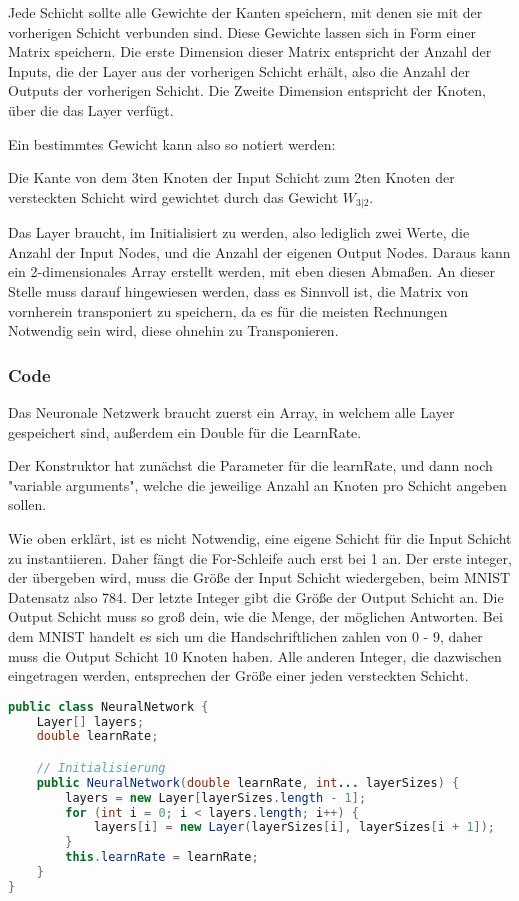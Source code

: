 \documentclass[12pt]{article}
\begin{document}
Jede Schicht sollte alle Gewichte der Kanten speichern, mit denen sie mit der vorherigen Schicht verbunden sind. Diese Gewichte lassen sich in Form einer Matrix speichern. Die erste Dimension dieser Matrix entspricht der Anzahl der Inputs, die der Layer aus der vorherigen Schicht erhält, also die Anzahl der Outputs der vorherigen Schicht. Die Zweite Dimension entspricht der Knoten, über die das Layer verfügt.

Ein bestimmtes Gewicht kann also so notiert werden:

Die Kante von dem 3ten Knoten der Input Schicht zum 2ten Knoten der versteckten Schicht wird gewichtet durch das Gewicht \(W_{3|2}\).

Das Layer braucht, im Initialisiert zu werden, also lediglich zwei Werte, die Anzahl der Input Nodes, und die Anzahl der eigenen Output Nodes. Daraus kann ein 2-dimensionales Array erstellt werden, mit eben diesen Abmaßen. An dieser Stelle muss darauf hingewiesen werden, dass es Sinnvoll ist, die Matrix von vornherein transponiert zu speichern, da es für die meisten Rechnungen Notwendig sein wird, diese ohnehin zu Transponieren.

\subsubsection{Code}
Das Neuronale Netzwerk braucht zuerst ein Array, in welchem alle Layer gespeichert sind, außerdem ein Double für die LearnRate.

Der Konstruktor hat zunächst die Parameter für die learnRate, und dann noch "variable arguments", welche die jeweilige Anzahl an Knoten pro Schicht angeben sollen.

Wie oben erklärt, ist es nicht Notwendig, eine eigene Schicht für die Input Schicht zu instantiieren. Daher fängt die For-Schleife auch erst bei 1 an. Der erste integer, der übergeben wird, muss die Größe der Input Schicht wiedergeben, beim MNIST Datensatz also 784. Der letzte Integer gibt die Größe der Output Schicht an. Die Output Schicht muss so groß dein, wie die Menge, der möglichen Antworten. Bei dem MNIST handelt es sich um die Handschriftlichen zahlen von 0 - 9, daher muss die Output Schicht 10 Knoten haben. Alle anderen Integer, die dazwischen eingetragen werden, entsprechen der Größe einer jeden versteckten Schicht.

\begin{lstlisting}[language=Java]
public class NeuralNetwork {
    Layer[] layers;
    double learnRate;

    // Initialisierung
    public NeuralNetwork(double learnRate, int... layerSizes) {
        layers = new Layer[layerSizes.length - 1];
        for (int i = 0; i < layers.length; i++) {
            layers[i] = new Layer(layerSizes[i], layerSizes[i + 1]);
        }
        this.learnRate = learnRate;
    }
}
\end{lstlisting}
\end{document}
